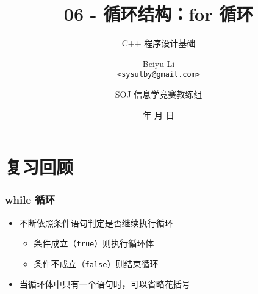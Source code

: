 \title[06 - 循环结构：for 循环]
{06 - 循环结构：for 循环}

\subtitle{C++ 程序设计基础}

\author[Beiyu Li]
{Beiyu Li\\
\texttt{<sysulby@gmail.com>}}


\date[\today]
{\number\year 年 \number\month 月 \number\day 日}




\author[sysulby]
{SOJ 信息学竞赛教练组}

\begin{frame}
    \titlepage
\end{frame}
\setcounter{framenumber}{0} %


\section{复习回顾}

\begin{frame}[fragile]
    \frametitle{while 循环}

    \begin{overlayarea}{\textwidth}{.7\textheight}
        \begin{itemize}

                

            \item<1-> 不断依照条件语句判定是否继续执行循环

                \begin{itemize}
                    \item<2-> 条件成立（\lstinline|true|）则执行循环体
                    \item<2-> 条件不成立（\lstinline|false|）则结束循环
                \end{itemize}

            \item<3-> 当循环体中只有一个语句时，可以省略花括号
        \end{itemize}
    \end{overlayarea}
\end{frame}

